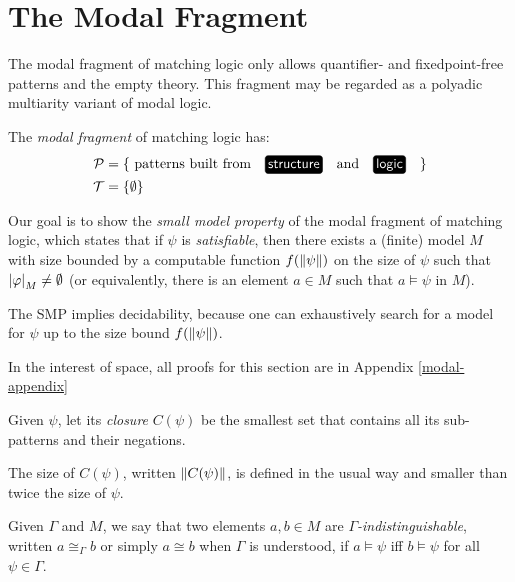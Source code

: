 \hypertarget{sec:modal-fragment}{%
\section{The Modal Fragment}\label{sec:modal-fragment}}

The modal fragment of matching logic only allows quantifier- and fixedpoint-free
patterns and the empty theory.
This fragment may be regarded as a polyadic multiarity variant of modal logic.

\begin{definition}The \emph{modal fragment} of matching logic has:
\begin{align*}
\PP &= \{\text{ patterns built from \structure{} and \logic{} }\} \\
\TT &= \{\emptyset\}
\end{align*}\end{definition}

Our goal is to show the \emph{small model property} of the modal fragment of matching logic,
which states that if \(\psi\) is \emph{satisfiable},
then there exists a (finite) model \(M\) with size bounded by a computable
function \(f(\left\lVert \psi\right\rVert)\) on the size of \(\psi\)
such that \(\left| {\varphi} \right|_M \neq \emptyset\)
(or equivalently, there is an element
\(a \in M\) such that \(a \vDash \psi\) in \(M\)).

The SMP implies decidability,
because one can exhaustively search for a model for \(\psi\)
up to the size bound \(f(\left\lVert \psi\right\rVert)\).

\begin{remark}In the interest of space, all proofs for this section are in Appendix \ref{modal-appendix}\end{remark}

\begin{definition}[Closure]Given \(\psi\), let its \emph{closure} \(C(\psi)\) be the smallest set
that contains all its sub-patterns and their negations.\end{definition}

The size of \(C(\psi)\), written \(\left\lVert C(\psi)\right\rVert\),
is defined in the usual way and smaller than twice the size of \(\psi\).

\begin{definition}Given \(\Gamma\) and \(M\), we say that two elements \(a,b \in M\) are
\emph{\(\Gamma\)-indistinguishable}, written \(a \cong_\Gamma b\) or simply
\(a \cong b\) when \(\Gamma\) is understood,
if \(a \vDash \psi\) iff \(b \vDash \psi\) for all \(\psi \in \Gamma\).\end{definition}

